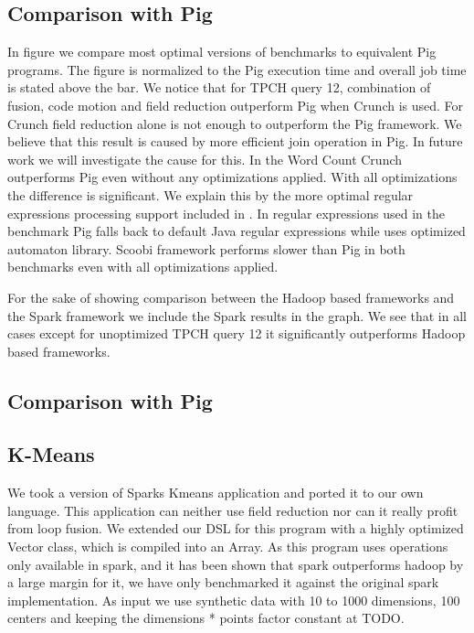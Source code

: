 \subsection{Comparison with Pig}
\label{subsec:pig}
In figure \todo{\ref{}} we compare most optimal versions of benchmarks to equivalent Pig programs. The figure is normalized to the Pig execution time and overall job time is stated above the bar. We notice that for TPCH query 12, combination of fusion, code motion and field reduction outperform Pig when Crunch is used. For Crunch field reduction alone is not enough to outperform the Pig framework. We believe that this result is caused by more efficient join operation in Pig. In future work we will investigate the cause for this. 
In the Word Count Crunch outperforms Pig even without any optimizations applied. With all optimizations the difference is significant. We explain this by the more optimal regular expressions processing support included in \tool. In regular expressions used in the benchmark Pig falls back to default Java regular expressions while \tool uses optimized automaton library. Scoobi framework performs slower than Pig in both benchmarks even with all optimizations applied.

For the sake of showing comparison between the Hadoop based frameworks and the Spark framework we include the Spark results in the graph. We see that in all cases except for unoptimized TPCH query 12 it significantly outperforms Hadoop based frameworks.

\subsection{Comparison with Pig}
\label{subsec:pig}

\subsection{K-Means}
\label{subsec:kmeans}
We took a version of Sparks Kmeans application and ported it to our own language. This application can neither use field reduction nor can it really profit from loop fusion. We extended our DSL for this program with a highly optimized Vector class, which is compiled into an Array. As this program uses operations only available in spark, and it has been shown that spark outperforms hadoop by a large margin for it, we have only benchmarked it against the original spark implementation. As input we use synthetic data with 10 to 1000 dimensions, 100 centers and keeping the dimensions * points factor constant at TODO. \\
